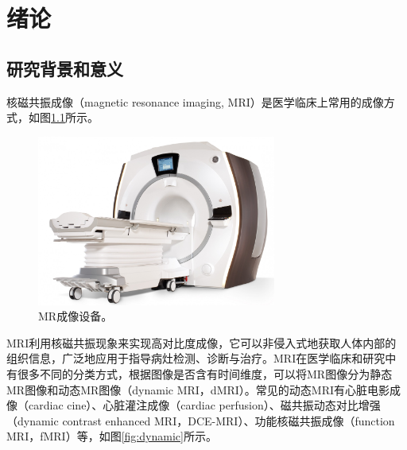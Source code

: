 \chapter{绪论}
\label{chap:introduction}

\section{研究背景和意义}
核磁共振成像\cite{mrireview}（magnetic resonance imaging, MRI）是医学临床上常用的成像方式，如图\ref{fig:mri}所示。
\begin{figure}[htbp]
\centerline{\includegraphics[width=0.7\textwidth]{img/intro/mri.jpg}}
\caption{MR成像设备。}
\label{fig:mri}
\end{figure}
MRI利用核磁共振现象来实现高对比度成像，它可以非侵入式地获取人体内部的组织信息，广泛地应用于指导病灶检测、诊断与治疗。MRI在医学临床和研究中有很多不同的分类方式，根据图像是否含有时间维度，可以将MR图像分为静态MR图像和动态MR图像（dynamic MRI，dMRI）。常见的动态MRI有心脏电影成像（cardiac cine）、心脏灌注成像（cardiac perfusion）、磁共振动态对比增强（dynamic contrast enhanced MRI，DCE-MRI）、功能核磁共振成像（function MRI，fMRI）等，如图\ref{fig:dynamic}所示。
